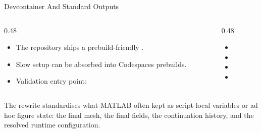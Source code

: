 \documentclass[aspectratio=169,10pt]{beamer}
\begin{document}
\begin{frame}{Devcontainer And Standard Outputs}
\small
\begin{columns}[T,totalwidth=\textwidth]
\begin{column}{0.48\textwidth}
\begin{softbox}
\begin{itemize}
  \item The repository ships a prebuild-friendly .
  \item Slow setup can be absorbed into Codespaces prebuilds.
  \item Validation entry point: 
\end{itemize}
\end{softbox}
\end{column}
\begin{column}{0.48\textwidth}
\begin{softbox}
\begin{itemize}
  \item {}
  \item {}
  \item {}
  \item {}
\end{itemize}
\end{softbox}
\end{column}
\end{columns}
\vspace{0.18cm}
\begin{callout}
The rewrite standardises what MATLAB often kept as script-local variables or ad hoc figure state: the final mesh, the final fields, the continuation history, and the resolved runtime configuration.
\end{callout}
\end{frame}
\end{document}
